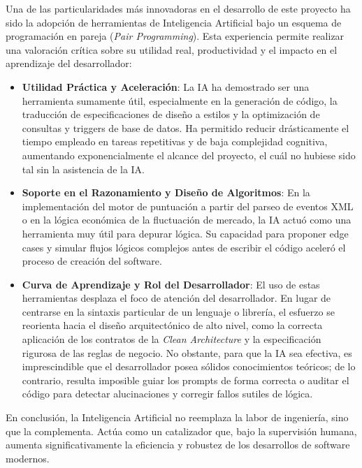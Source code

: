 Una de las particularidades más innovadoras en el desarrollo de este proyecto ha sido la adopción de herramientas de Inteligencia Artificial bajo un esquema de programación en pareja (\textit{Pair Programming}). Esta experiencia permite realizar una valoración crítica sobre su utilidad real, productividad y el impacto en el aprendizaje del desarrollador:

\begin{itemize}
    \item \textbf{Utilidad Práctica y Aceleración}: La IA ha demostrado ser una herramienta sumamente útil, especialmente en la generación de código, la traducción de especificaciones de diseño a estilos y la optimización de consultas y triggers de base de datos. Ha permitido reducir drásticamente el tiempo empleado en tareas repetitivas y de baja complejidad cognitiva, aumentando exponencialmente el alcance del proyecto, el cuál no hubiese sido tal sin la asistencia de la IA.
    \item \textbf{Soporte en el Razonamiento y Diseño de Algoritmos}: En la implementación del motor de puntuación a partir del parseo de eventos XML o en la lógica económica de la fluctuación de mercado, la IA actuó como una herramienta muy útil para depurar lógica. Su capacidad para proponer edge cases y simular flujos lógicos complejos antes de escribir el código aceleró el proceso de creación del software.
    \item \textbf{Curva de Aprendizaje y Rol del Desarrollador}: El uso de estas herramientas desplaza el foco de atención del desarrollador. En lugar de centrarse en la sintaxis particular de un lenguaje o librería, el esfuerzo se reorienta hacia el diseño arquitectónico de alto nivel, como la correcta aplicación de los contratos de la \textit{Clean Architecture} y la especificación rigurosa de las reglas de negocio. No obstante, para que la IA sea efectiva, es imprescindible que el desarrollador posea sólidos conocimientos teóricos; de lo contrario, resulta imposible guiar los prompts de forma correcta o auditar el código para detectar alucinaciones y corregir fallos sutiles de lógica.
\end{itemize}

En conclusión, la Inteligencia Artificial no reemplaza la labor de ingeniería, sino que la complementa. Actúa como un catalizador que, bajo la supervisión humana, aumenta significativamente la eficiencia y robustez de los desarrollos de software modernos.

